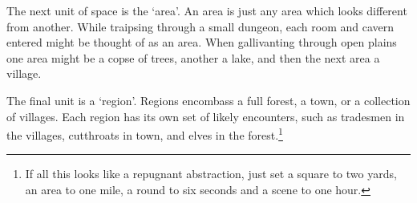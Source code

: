 \begin{multicols}{2}
The next unit of space is the `\gls{area}'.
An \gls{area} is just any \gls{area} which looks different from another.
While traipsing through a small dungeon, each room and cavern entered might be thought of as an \gls{area}.
When gallivanting through open plains one \gls{area} might be a copse of trees, another a lake, and then the next area a village.

The final unit is a `region'.
Regions encombass a full forest, a town, or a collection of villages.
Each region has its own set of likely encounters, such as tradesmen in the villages, cutthroats in town, and elves in the forest.\footnote{If all this looks like a repugnant abstraction, just set a square to two yards, an area to one mile, a \gls{round} to six seconds and a scene to one hour.}

\end{multicols}


